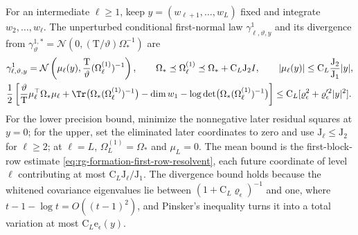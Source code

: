For an intermediate \(\ell\ge1\), keep \(y=(w_{\ell+1},\ldots,w_L)\) fixed and
integrate \(w_2,\ldots,w_\ell\). The unperturbed conditional first-normal law
\(\gamma^1_{\ell,\vartheta,y}\) and its divergence from
\(\gamma^{1,*}_\vartheta=\mathcal N(0,(\mathrm T/\vartheta)\Omega_*^{-1})\) are
\begin{align}
 &\gamma^1_{\ell,\vartheta,y}
 =\mathcal N\left(\mu_\ell(y),\frac{\mathrm T}{\vartheta}(\Omega^{(1)}_\ell)^{-1}\right),\qquad
 \Omega_*\preceq\Omega^{(1)}_\ell\preceq\Omega_*+\mathrm C_L\mathrm J_2I,\qquad
 |\mu_\ell(y)|\le \mathrm C_L\frac{\mathrm J_2}{\mathrm J_1}|y|,
 \label{eq:rg-formation-first-normal-conditional}\\
 &\frac12\left[
  \frac{\vartheta}{\mathrm T}\mu_\ell^\top\Omega_*\mu_\ell
  +\Tr\bigl(\Omega_*(\Omega^{(1)}_\ell)^{-1}\bigr)-\dim w_1
            -\log\det\bigl(\Omega_*(\Omega^{(1)}_\ell)^{-1}\bigr)\right]
 \le \mathrm C_L[\varrho_\epsilon^2+\varrho_\epsilon'^2|y|^2].
 \label{eq:rg-formation-first-normal-gaussian-kl}
\end{align}
For the lower precision bound, minimize the nonnegative later residual squares
at \(y=0\); for the upper, set the eliminated later coordinates to zero and use
\(\mathrm J_\ell\le\mathrm J_2\) for \(\ell\ge2\); at \(\ell=L\),
\(\Omega^{(1)}_L=\Omega_*\) and \(\mu_L=0\). The mean bound is the
first-block-row estimate \cref{eq:rg-formation-first-row-resolvent}, each
future coordinate of level \(\ell\) contributing at most
\(\mathrm C_L\mathrm J_\ell/\mathrm J_1\). The divergence bound holds because
the whitened covariance eigenvalues lie between
\((1+\mathrm C_L\varrho_\epsilon)^{-1}\) and one, where
\(t-1-\log t=O((t-1)^2)\), and Pinsker's inequality turns it into a total
variation at most \(\mathrm C_L\mathrm e_\epsilon(y)\).

